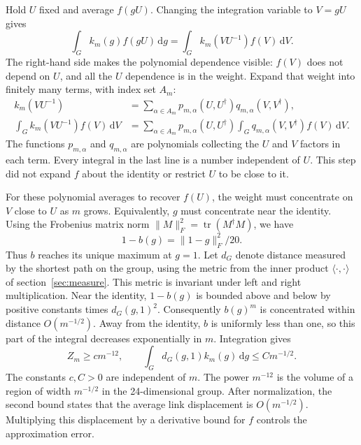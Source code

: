 \documentclass[11pt,a4paper]{article}
\theoremstyle{remark}
\DeclareMathOperator{\tr}{tr}
\newcommand{\dd}{\mathrm d}
\begin{document}
Hold $U$ fixed and average $f(gU)$. Changing the integration variable
to $V=gU$ gives
\begin{equation}
 \int_G k_m(g)f(gU)\,\dd g
       =\int_G k_m(VU^{-1})f(V)\,\dd V .
 \label{poly:one-link-average}
\end{equation}
The right-hand side makes the polynomial dependence visible: $f(V)$
does not depend on $U$, and all the $U$ dependence is in the weight.
Expand that weight into finitely many terms, with index set $A_m$:
\begin{equation}
 \begin{split}
 k_m(VU^{-1})
    &=\sum_{\alpha\in A_m}
        p_{m,\alpha}(U,U^\dagger)q_{m,\alpha}(V,V^\dagger),\\
 \int_G k_m(VU^{-1})f(V)\,\dd V
    &=\sum_{\alpha\in A_m}p_{m,\alpha}(U,U^\dagger)
       \int_G q_{m,\alpha}(V,V^\dagger)f(V)\,\dd V .
 \end{split}
 \label{poly:one-link-polynomial}
\end{equation}
The functions $p_{m,\alpha}$ and $q_{m,\alpha}$ are polynomials
collecting the $U$ and $V$ factors in each term. Every integral in
the last line is a number independent of $U$. This step did not expand
$f$ about the identity or restrict $U$ to be close to it.

For these polynomial averages to recover $f(U)$, the weight must
concentrate on $V$ close to $U$ as $m$ grows. Equivalently, $g$ must
concentrate near the identity. Using the Frobenius matrix norm
$\|M\|_F^2=\tr(M^\dagger M)$, we have
\begin{equation}
 1-b(g)=\|1-g\|_F^2/20 .
\end{equation}
Thus $b$ reaches its unique maximum at $g=1$. Let $d_G$ denote
distance measured by the shortest path on the group, using the metric
from the inner product $\langle\cdot,\cdot\rangle$ of
section~\ref{sec:measure}. This metric is invariant under left and right
multiplication. Near the identity, $1-b(g)$ is bounded above and below
by positive constants times $d_G(g,1)^2$. Consequently $b(g)^m$
is concentrated within distance $O(m^{-1/2})$. Away from the identity,
$b$ is uniformly less than one, so this part of the integral decreases
exponentially in $m$. Integration gives
\begin{equation}
 Z_m\geq c m^{-12},\qquad
 \int_Gd_G(g,1)k_m(g)\,\dd g\leq C m^{-1/2}.
 \label{poly:concentration}
\end{equation}
The constants $c,C>0$ are independent of $m$. The power $m^{-12}$
is the volume of a region of width $m^{-1/2}$ in the 24-dimensional
group. After normalization, the second bound states that the average
link displacement is $O(m^{-1/2})$. Multiplying this displacement
by a derivative bound for $f$ controls the approximation error.
\end{document}
